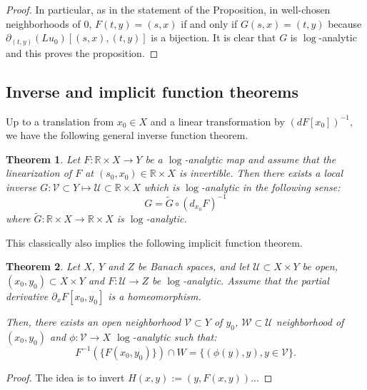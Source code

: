 \documentclass[12pt]{article}
\newtheorem{thm}{Theorem}[section]
\begin{document}
\begin{proof}
        In particular, as in the statement of the Proposition, in well-chosen neighborhoods of $0$, $F(t,y)=(s,x)$ if and only if $ G(s,x)=(t,y)$ because $\partial_{(t,y)}(L u_0)[(s,x),(t,y)]$ is a bijection. It is clear that $G$ is $\log$-analytic and this proves the proposition.
    \end{proof}
    
    
    \subsection{Inverse and implicit function theorems}
    
    Up to a translation from $x_0\in X$ and a linear transformation by $\left(dF[x_0]\right)^{-1}$, we have the following general inverse function theorem.
    
    \begin{thm}\label{inverse fct theorem log}
    		Let $F:\mathbb{R}\times X \to Y$ be a $\log$-analytic map and assume that the linearization of $F$ at $(s_0,x_0)\in \mathbb{R}\times X$ is invertible. Then there exists a local inverse $G: \mathcal{V}\subset Y\mapsto \mathcal{U}\subset\mathbb{R}\times X$ which is $\log$-analytic in the following sense:
    		$$ G = \tilde{G}\circ (d_{x_0}F)^{-1} $$
    		where $\tilde{G}:\mathbb{R}\times X \to \mathbb{R}\times X $ is $\log$-analytic.
    \end{thm}
    
    
    This classically also implies the following implicit function theorem.
    
    \begin{thm}\label{implicit fct theorem log}
         Let $X$, $Y$ and $Z$ be Banach spaces, and let $\mathcal{U}\subset X\times Y$ be open, $(x_0,y_0)\subset X\times Y$ and $F:\mathcal{U}\to Z$ be $\log$-analytic. Assume that the partial derivative $\partial_xF[x_0,y_0]$ is a homeomorphism.
         
         Then, there exists an open neighborhood $\mathcal{V} \subset Y$ of $y_0$, $\mathcal{W}\subset\mathcal{U}$ neighborhood of $(x_0,y_0)$ and $ \phi:\mathcal{V}\to X$ $\log$-analytic such that:
         $$F^{-1}(\{F(x_0,y_0)\})\cap W = \{(\phi(y),y), y\in \mathcal{V} \}.$$
    \end{thm}
    \begin{proof}
    The idea is to invert $H(x,y):=(y,F(x,y))$...
    \end{proof}
    
\end{document}
